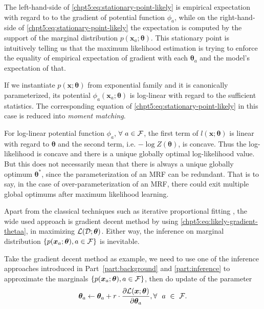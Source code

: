 The left-hand-side of \eqref{chpt5:eq:stationary-point-likely} is empirical expectation with regard to to the gradient of potential function $\phi_a$, while on the right-hand-side of \eqref{chpt5:eq:stationary-point-likely} the expectation is computed by the support of the marginal distribution $p(\bm{x}_a; \bm{\theta})$. This stationary point is intuitively telling us that the maximum likelihood estimation is trying to enforce the equality of empirical expectation of gradient with each $\bm{\theta}_a$ and the model's expectation of that.
\begin{remark}
  If we instantiate $p(\bm{x};\bm{\theta})$ from exponential family and it is canonically parameterized, its potential $\phi_a(\bm{x}_a; \bm{\theta})$ is log-linear with regard to the sufficient statistics. The corresponding equation of \eqref{chpt5:eq:stationary-point-likely} in this case is reduced into \textit{moment matching}.

  {For log-linear potential function $\phi_a$, $\forall ~a \in \mathcal{F}$, the first term of $l(\bm{x}; \bm{\theta})$ is linear with regard to $\bm{\theta}$ and the second term, i.e. $-\log{Z(\bm{\theta})}$, is concave. Thus the log-likelihood is concave and there is a unique globally optimal log-likelihood value. But this does not necessarily mean that there is always a unique globally optimum $\bm{\theta}^{\ast}$, since the parameterization of an MRF can be redundant. That is to say, in the case of over-parameterization of an MRF, there could exit multiple global optimums after maximum likelihood learning.}
  
\end{remark}

Apart from the classical techniques such as iterative proportional fitting \cite[Section~6.1]{wainwright2008graphical}\cite{eric10-708ipf}, the wide used approach is gradient decent method by using \eqref{chpt5:eq:likely-gradient-thetaa}, in maximizing $\mathcal{L}(\mathcal{D}; \bm{\theta})$. Either way, the inference on marginal distribution $\left\{ p(\bm{x}_a; \bm{\theta}), a \in \mathcal{F} \right\}$ is inevitable.

Take the gradient decent method as example, we need to use one of the inference approaches introduced in Part~\ref{part:background} and \ref{part:inference} to approximate the marginals $\left\{ p(\bm{x}_a; \bm{\theta}), a \in \mathcal{F} \right\}$, then do update of the parameter
\begin{equation}
  \bm{\theta}_a \leftarrow \bm{\theta}_a + r \cdot \frac{ \partial \mathcal{L}(\bm{x};\bm{\theta})}{\partial \bm{\theta}_a}, \forall~~a~\in~\mathcal{F}.
\end{equation}

